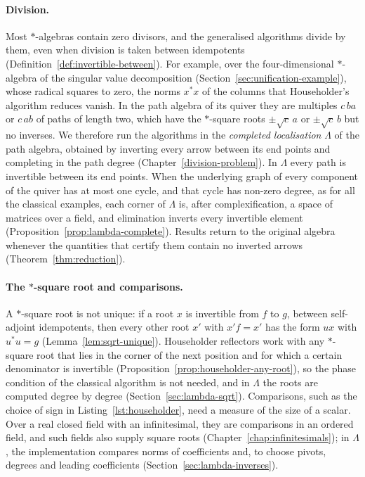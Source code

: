 \documentclass[12pt, a4paper]{report}
\theoremstyle{plain}
\theoremstyle{definition}
\theoremstyle{remark}
\theoremstyle{plain}
\newcommand{\staralgs}[0]{$*$-algebras}
\begin{document}
\paragraph{Division.} Most \staralgs{} contain zero divisors, and the generalised algorithms divide by them, even when division is taken between idempotents (Definition~\ref{def:invertible-between}). For example, over the four-dimensional $*$-algebra of the singular value decomposition (Section~\ref{sec:unification-example}), whose radical squares to zero, the norms $x^*x$ of the columns that Householder's algorithm reduces vanish. In the path algebra of its quiver they are multiples $c\,ba$ or $c\,ab$ of paths of length two, which have the $*$-square roots $\pm\sqrt c\,a$ or $\pm\sqrt c\,b$ but no inverses. We therefore run the algorithms in the \emph{completed localisation} $\Lambda$ of the path algebra, obtained by inverting every arrow between its end points and completing in the path degree (Chapter~\ref{division-problem}). In $\Lambda$ every path is invertible between its end points. When the underlying graph of every component of the quiver has at most one cycle, and that cycle has non-zero degree, as for all the classical examples, each corner of $\Lambda$ is, after complexification, a space of matrices over a field, and elimination inverts every invertible element (Proposition~\ref{prop:lambda-complete}). Results return to the original algebra whenever the quantities that certify them contain no inverted arrows (Theorem~\ref{thm:reduction}).

\paragraph{The $*$-square root and comparisons.} A $*$-square root is not unique: if a root $x$ is invertible from $f$ to $g$, between self-adjoint idempotents, then every other root $x'$ with $x'f=x'$ has the form $ux$ with $u^*u=g$ (Lemma~\ref{lem:sqrt-unique}). Householder reflectors work with any $*$-square root that lies in the corner of the next position and for which a certain denominator is invertible (Proposition~\ref{prop:householder-any-root}), so the phase condition of the classical algorithm is not needed, and in $\Lambda$ the roots are computed degree by degree (Section~\ref{sec:lambda-sqrt}). Comparisons, such as the choice of sign in Listing~\ref{lst:householder}, need a measure of the size of a scalar. Over a real closed field with an infinitesimal, they are comparisons in an ordered field, and such fields also supply square roots (Chapter~\ref{chap:infinitesimals}); in $\Lambda$, the implementation compares norms of coefficients and, to choose pivots, degrees and leading coefficients (Section~\ref{sec:lambda-inverses}).
\end{document}
